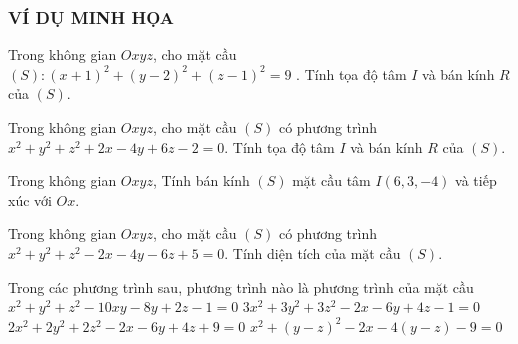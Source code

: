 \subsubsection{VÍ DỤ MINH HỌA}
\begin{vd}%
	Trong không gian $Oxyz$, cho mặt cầu $(S )\colon (x+1 )^2+(y-2 )^2+(z-1 )^2=9$ . Tính tọa độ tâm $I$ và bán kính $R$ của $(S )$. 
\end{vd}
\begin{vd}%
	Trong không gian $Oxyz$, cho mặt cầu $(S )$ có phương trình $x^2+y^2+z^2+2x-4y+6z-2=0$. Tính tọa độ tâm $I$ và bán kính $R$ của $(S )$.
\end{vd}
\begin{vd}%
	Trong không gian $Oxyz$, Tính bán kính $(S)$ mặt cầu tâm $I(6,3,-4 )$ và tiếp xúc với $Ox$.
\end{vd}
\begin{vd}%
	Trong không gian $Oxyz$, 
	cho mặt cầu $(S)$ có phương trình $x^2+y^2+z^2-2x-4y-6z+5=0$. 
	Tính diện tích của mặt cầu $(S )$.
\end{vd}
\begin{vd}%
	Trong các phương trình sau, phương trình nào là phương trình của mặt cầu
	\choice 
	{ $x^2+y^2+z^2-10xy-8y+2z-1=0$}
	{ \True $3x^2+3y^2+3z^2-2x-6y+4z-1=0$} 
	{ $2x^2+2y^2+2z^2-2x-6y+4z+9=0$}
	{ $x^2+(y-z )^2-2x-4(y-z )-9=0$} 
\end{vd}

